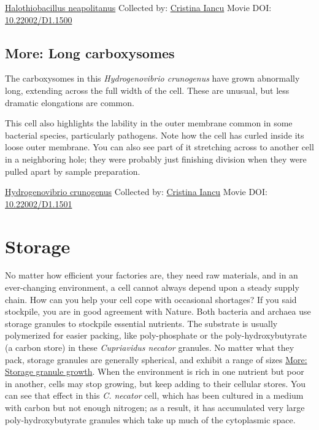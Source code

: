 \documentclass[]{tufte-book}
\begin{document}
\hypertarget{htmlwidget-2feb55a0e577f4e594ab}{}

\label{fig:4-7a}\protect\hyperlink{tree}{Halothiobacillus neapolitanus} Collected by: \protect\hyperlink{cristina_iancu}{Cristina Iancu} Movie DOI: \href{https://doi.org/10.22002/D1.1500}{10.22002/D1.1500}

\hypertarget{Long_carboxysomes}{%
\subsection*{More: Long carboxysomes}\label{Long_carboxysomes}}

The carboxysomes in this \emph{Hydrogenovibrio crunogenus} have grown abnormally long, extending across the full width of the cell. These are unusual, but less dramatic elongations are common.

This cell also highlights the lability in the outer membrane common in some bacterial species, particularly pathogens. Note how the cell has curled inside its loose outer membrane. You can also see part of it stretching across to another cell in a neighboring hole; they were probably just finishing division when they were pulled apart by sample preparation.



\hypertarget{htmlwidget-e64ba0f4c6642060b05f}{}

\label{fig:4-7b}\protect\hyperlink{tree}{Hydrogenovibrio crunogenus} Collected by: \protect\hyperlink{cristina_iancu}{Cristina Iancu} Movie DOI: \href{https://doi.org/10.22002/D1.1501}{10.22002/D1.1501}

\hypertarget{storage}{%
\section{Storage}\label{storage}}

No matter how efficient your factories are, they need raw materials, and in an ever-changing environment, a cell cannot always depend upon a steady supply chain. How can you help your cell cope with occasional shortages? If you said stockpile, you are in good agreement with Nature. Both bacteria and archaea use storage granules to stockpile essential nutrients. The substrate is usually polymerized for easier packing, like poly-phosphate or the poly-hydroxybutyrate (a carbon store) in these \emph{Cupriavidus necator} granules. No matter what they pack, storage granules are generally spherical, and exhibit a range of sizes \protect\hyperlink{Storage_granule_growth}{More: Storage granule growth}. When the environment is rich in one nutrient but poor in another, cells may stop growing, but keep adding to their cellular stores. You can see that effect in this \emph{C. necator} cell, which has been cultured in a medium with carbon but not enough nitrogen; as a result, it has accumulated very large poly-hydroxybutyrate granules which take up much of the cytoplasmic space.
\end{document}
